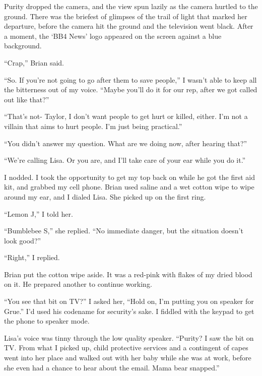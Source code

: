 Purity dropped the camera, and the view spun lazily as the camera hurtled to the ground.  There was the briefest of glimpses of the trail of light that marked her departure, before the camera hit the ground and the television went black.  After a moment, the `BB4 News' logo appeared on the screen against a blue background.



``Crap,'' Brian said.



``So.  If you're not going to go after them to save people,'' I wasn't able to keep all the bitterness out of my voice.  ``Maybe you'll do it for our rep, after we got called out like that?''



``That's not- Taylor, I don't want people to get hurt or killed, either.  I'm not a villain that aims to hurt people.  I'm just being practical.''



``You didn't answer my question.  What are we doing now, after hearing that?''



``We're calling Lisa.  Or you are, and I'll take care of your ear while you do it.''



I nodded.  I took the opportunity to get my top back on while he got the first aid kit, and grabbed my cell phone.  Brian used saline and a wet cotton wipe to wipe around my ear, and I dialed Lisa.  She picked up on the first ring.



``Lemon J,'' I told her.



``Bumblebee S,'' she replied.  ``No immediate danger, but the situation doesn't look good?''



``Right,'' I replied.



Brian put the cotton wipe aside.  It was a red-pink with flakes of my dried blood on it.  He prepared another to continue working.



``You see that bit on TV?'' I asked her, ``Hold on, I'm putting you on speaker for Grue.''  I'd used his codename for security's sake.  I fiddled with the keypad to get the phone to speaker mode.



Lisa's voice was tinny through the low quality speaker.  ``Purity?  I saw the bit on TV.  From what I picked up, child protective services and a contingent of capes went into her place and walked out with her baby while she was at work, before she even had a chance to hear about the email.  Mama bear snapped.''



